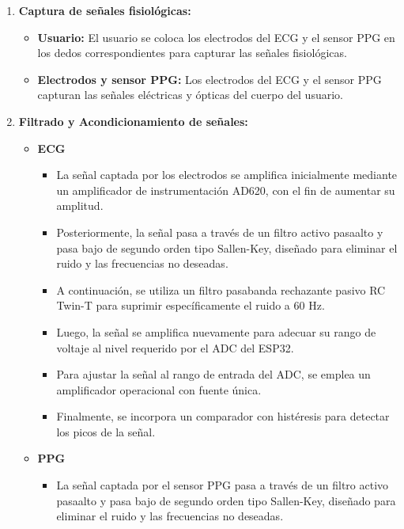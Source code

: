     \begin{enumerate}
        \item \textbf{Captura de señales fisiológicas:}
            \begin{itemize}
                \item \textbf{Usuario:} El usuario se coloca los electrodos del ECG y el sensor PPG en los dedos correspondientes para capturar las señales fisiológicas.
                \item \textbf{Electrodos y sensor PPG:} Los electrodos del ECG y el sensor PPG capturan las señales eléctricas y ópticas del cuerpo del usuario.
            \end{itemize}
        \item \textbf{Filtrado y Acondicionamiento de señales:}
            \begin{itemize}
                \item \textbf{ECG}
                    \begin{itemize}
                        \item La señal captada por los electrodos se amplifica inicialmente mediante un amplificador de instrumentación AD620, con el fin de aumentar su amplitud.
                        \item Posteriormente, la señal pasa a través de un filtro activo pasaalto y pasa bajo de segundo orden tipo Sallen-Key, diseñado para eliminar el ruido y las frecuencias no deseadas.
                        \item A continuación, se utiliza un filtro pasabanda rechazante pasivo RC Twin-T para suprimir específicamente el ruido a 60 Hz.
                        \item Luego, la señal se amplifica nuevamente para adecuar su rango de voltaje al nivel requerido por el ADC del ESP32.
                        \item Para ajustar la señal al rango de entrada del ADC, se emplea un amplificador operacional con fuente única.
                        \item Finalmente, se incorpora un comparador con histéresis para detectar los picos de la señal.
                    \end{itemize}
                \item \textbf{PPG}
                    \begin{itemize}
                        \item La señal captada por el sensor PPG pasa a través de un filtro activo pasaalto y pasa bajo de segundo orden tipo Sallen-Key, diseñado para eliminar el ruido y las frecuencias no deseadas.

\end{itemize}
\end{itemize}
\end{enumerate}
